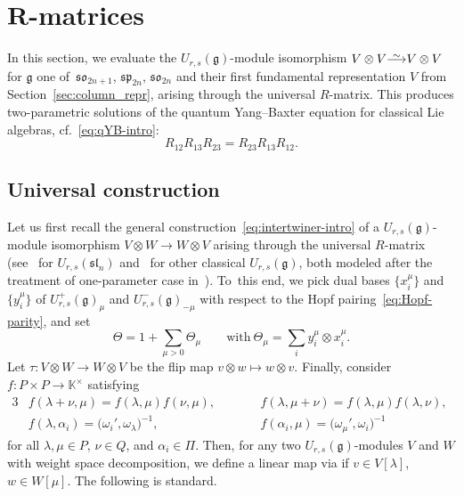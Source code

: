 \documentclass[10pt,a4paper]{amsart}
\numberwithin{equation}{section}
\newcommand{\fg}{\mathfrak{g}}
\newcommand{\ssl}{\mathfrak{sl}}
\newcommand{\sso}{\mathfrak{so}}
\newcommand{\ssp}{\mathfrak{sp}}
\newcommand{\uu}{U_{r,s}(\fg)}
\newcommand\iso{ \vphantom{j^{X^2}}\smash{\overset{\sim}{\vphantom{\rule{0pt}{0.20em}}\smash{\longrightarrow}}} }
\begin{document}
\section[R-matrices]{$\boldsymbol{R}$-matrices}\label{sec:R-matrices}

In this section, we evaluate the $\uu$-module isomorphism $V \otimes V \iso V \otimes V$ for $\fg$ one of~$\sso_{2n + 1}$, $\ssp_{2n}$, $\sso_{2n}$ and their first fundamental representation $V$ from Section~\ref{sec:column_repr}, arising through the universal $R$-matrix. This produces two-parametric solutions of the quantum Yang--Baxter equation for classical Lie algebras, cf.\ \eqref{eq:qYB-intro}:
\begin{equation}\label{eq:qYB}
 R_{12}R_{13}R_{23}=R_{23}R_{13}R_{12}.
\end{equation}

\subsection{Universal construction}\label{ssec:universal-R}

Let us first recall the general construction~\eqref{eq:intertwiner-intro} of a $\uu$-module isomorphism $V \otimes W \to W \otimes V$ arising through the universal $R$-matrix (see~\cite[Section~4]{BW1} for $U_{r,s}(\ssl_n)$ and~\cite[Section~3]{BGH2} for other classical $U_{r,s}(\fg)$, both modeled after the treatment of one-parameter case in~\cite[Section~7]{J}). To~this end, we pick dual bases $\bigl\{x_{i}^{\mu}\bigr\}$ and $\bigl\{y_{i}^{\mu}\bigr\}$ of $U^{+}_{r,s}(\fg)_{\mu}$ and $U^{-}_{r,s}(\fg)_{-\mu}$ with respect to the Hopf pairing~\eqref{eq:Hopf-parity}, and set
\begin{equation}\label{eq:Theta}
 \Theta = 1 + \sum_{\mu > 0}\Theta_{\mu} \qquad \text{with} \
 \Theta_{\mu} = \sum_{i} y_{i}^{\mu} \otimes x_{i}^{\mu}.
\end{equation}
Let $\tau\colon V \otimes W \to W \otimes V$ be the flip map $v \otimes w \mapsto w \otimes v$.
Finally, consider $f\colon P \times P \to \mathbb{K}^{\times}$ satisfying
\begin{alignat}{3}
 &f(\lambda + \nu,\mu) = f(\lambda,\mu)f(\nu,\mu), \qquad&&
 f(\lambda,\mu + \nu) = f(\lambda,\mu)f(\lambda,\nu) , &\nonumber \\
 &f(\lambda,\alpha_{i}) = \bigl(\omega_{i}',\omega_{\lambda}\bigr)^{-1}, \qquad&&
 f(\alpha_{i},\mu) = \bigl(\omega_{\mu}',\omega_{i}\bigr)^{-1}&\label{eq:f}
\end{alignat}
for all $\lambda,\mu \in P$, $\nu \in Q$, and $\alpha_{i} \in \Pi$. Then, for any two $\uu$-modules $V$ and $W$ with weight space decomposition, we define a linear map  via  if $v \in V[\lambda]$, $w \in W[\mu]$. The following is standard.
\end{document}
